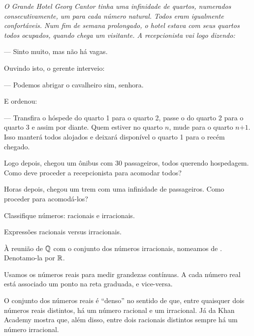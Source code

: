 {\itshape O Grande Hotel Georg Cantor tinha uma infinidade de quartos, numerados consecutivamente, um para cada número natural. Todos eram igualmente confortáveis. Num fim de semana prolongado, o hotel estava com seus quartos todos ocupados, quando chega um visitante. A recepcionista vai logo dizendo: 

--- Sinto muito, mas não há vagas. 

Ouvindo isto, o gerente interveio: 

--- Podemos abrigar o cavalheiro sim, senhora. 

E ordenou:

--- Transfira o hóspede do quarto 1 para o quarto 2, passe o do quarto 2 para o quarto 3 e assim por diante. Quem estiver no quarto $n$, mude para o quarto $\textit{n+1}$. Isso manterá todos alojados e deixará disponível o quarto 1 para o recém chegado.

Logo depois, chegou um ônibus com 30 passageiros, todos querendo hospedagem. Como deve proceder a recepcionista para acomodar todos? 

Horas depois, chegou um trem com uma infinidade de passageiros. Como proceder para acomodá-los?}

\begin{onlineact}
	{Classifique números: racionais e irracionais}.
\end{onlineact}

\begin{onlineact}
	{Expressões racionais versus irracionais}.
\end{onlineact}

\begin{definition}
À reunião de $\mathbb{Q}$ com o conjunto dos números irracionais, nomeamos de . Denotamo-la por $\mathbb{R}$.
\end{definition}

Usamos os números reais para medir grandezas contínuas. A cada número real está associado um ponto na reta graduada, e vice-versa. 

O conjunto dos números reais é ``denso'' no sentido de que, entre quaisquer dois números reais distintos, há um número racional e um irracional. Já  da Khan Academy mostra que, além disso, entre dois racionais distintos sempre há um número irracional.


